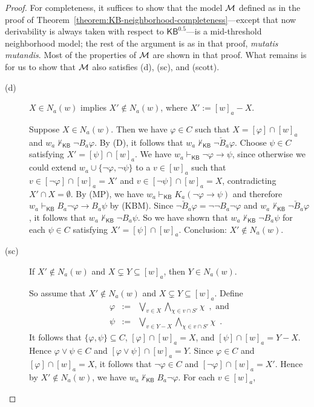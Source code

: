 \documentclass[12pt]{article}
\theoremstyle{definition}
\newcommand{\M}{{\cal M}}      %
\newcommand{\KB}{{\mathsf{KB}}}                        %
\newcommand{\KBeq}{{\mathsf{KB}^{\mathsf{0.5}}}}       %
\begin{document}
\begin{proof}
  For completeness, it suffices to show that the model $\M$ defined as
  in the proof of
  Theorem~\ref{theorem:KB-neighborhood-completeness}---except that now
  derivability is always taken with respect to $\KBeq$---is a
  mid-threshold neighborhood model; the rest of the argument is as in
  that proof, \emph{mutatis mutandis}.  Most of the properties of $\M$
  are shown in that proof.  What remains is for us to show that $\M$
  also satisfies (d), (sc), and (scott).
  \begin{description}
  \item[(d)] $X\in N_a(w)$ implies $X'\notin N_a(w)$, where
    $X':=[w]_a-X$.

    Suppose $X\in N_a(w)$.  Then we have $\varphi\in C$ such that
    $X=[\varphi]\cap[w]_a$ and $w_a\nvdash_\KB \lnot B_a\varphi$.  By
    (D), it follows that $w_a\nvdash_\KB\lnot \check B_a\varphi$.
    Choose $\psi\in C$ satisfying $X'=[\psi]\cap[w]_a$.  We have
    $w_a\vdash_\KB\lnot\varphi\to\psi$, since otherwise we could
    extend $w_a\cup\{\lnot\varphi,\lnot\psi\}$ to a $v\in[w]_a$ such
    that $v\in[\lnot\varphi]\cap[w]_a=X'$ and
    $v\in[\lnot\psi]\cap[w]_a=X$, contradicting $X'\cap X=\emptyset$.
    By (MP), we have $w_a\vdash_\KB K_a(\lnot\varphi\to\psi)$ and
    therefore $w_a\vdash_\KB B_a\lnot\varphi\to B_a\psi$ by (KBM).
    Since $\lnot\check B_a\varphi=\lnot\lnot B_a\lnot\varphi$ and
    $w_a\nvdash_\KB\lnot \check B_a\varphi$, it follows that
    $w_a\nvdash_\KB\lnot B_a\psi$.  So we have shown that
    $w_a\nvdash_\KB\lnot B_a\psi$ for each $\psi\in C$ satisfying
    $X'=[\psi]\cap[w]_a$.  Conclusion: $X'\notin N_a(w)$.

  \item[(sc)] If $X'\notin N_a(w)$ and $X\subsetneq Y\subseteq[w]_a$,
    then $Y\in N_a(w)$.

    So assume that $X'\notin
    N_a(w)$ and $X\subsetneq Y\subseteq[w]_a$. Define
    \begin{eqnarray*}
      \varphi &:=&
      \textstyle \bigvee_{v\in X}\bigwedge_{\chi\in v\cap S'}\chi
      \enspace,\text{ and}
      \\
      \psi &:=&
      \textstyle \bigvee_{v\in Y-X}\bigwedge_{\chi\in v\cap S'}\chi\enspace.
    \end{eqnarray*}
    It follows that $\{\varphi,\psi\}\subseteq C$,
    $[\varphi]\cap[w]_a=X$, and $[\psi]\cap[w]_a=Y-X$.  Hence
    $\varphi\lor\psi\in C$ and $[\varphi\lor\psi]\cap[w]_a=Y$.  Since
    $\varphi\in C$ and $[\varphi]\cap[w]_a=X$, it follows that
    $\lnot\varphi\in C$ and $[\lnot\varphi]\cap[w]_a=X'$.  Hence by
    $X'\notin N_a(w)$, we have $w_a\nvdash_\KB B_a\lnot\varphi$.  For
    each $v\in[w]_a$,


\end{description}
\end{proof}
\end{document}
